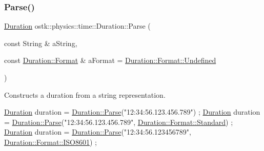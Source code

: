 \subsubsection{\texorpdfstring{Parse()}{Parse()}}
{\footnotesize\ttfamily \hyperlink{classostk_1_1physics_1_1time_1_1_duration}{Duration} ostk\+::physics\+::time\+::\+Duration\+::\+Parse (\begin{DoxyParamCaption}\item[{const String \&}]{a\+String,  }\item[{const \hyperlink{classostk_1_1physics_1_1time_1_1_duration_a4bf616b67d15e0fbc4beb4fcc306c368}{Duration\+::\+Format} \&}]{a\+Format = {\ttfamily \hyperlink{classostk_1_1physics_1_1time_1_1_duration_a4bf616b67d15e0fbc4beb4fcc306c368aec0fc0100c4fc1ce4eea230c3dc10360}{Duration\+::\+Format\+::\+Undefined}} }\end{DoxyParamCaption})\hspace{0.3cm}{\ttfamily [static]}}



Constructs a duration from a string representation. 


\begin{DoxyCode}
\hyperlink{classostk_1_1physics_1_1time_1_1_duration_a6ba3a020742ca6e3bf0b1970dd039c07}{Duration} duration = \hyperlink{classostk_1_1physics_1_1time_1_1_duration_afe4136976a7c4e5c2ec00c0aa5583b18}{Duration::Parse}(\textcolor{stringliteral}{"12:34:56.123.456.789"}) ;
\hyperlink{classostk_1_1physics_1_1time_1_1_duration_a6ba3a020742ca6e3bf0b1970dd039c07}{Duration} duration = \hyperlink{classostk_1_1physics_1_1time_1_1_duration_afe4136976a7c4e5c2ec00c0aa5583b18}{Duration::Parse}(\textcolor{stringliteral}{"12:34:56.123.456.789"}, 
      \hyperlink{classostk_1_1physics_1_1time_1_1_duration_a4bf616b67d15e0fbc4beb4fcc306c368aeb6d8ae6f20283755b339c0dc273988b}{Duration::Format::Standard}) ;
\hyperlink{classostk_1_1physics_1_1time_1_1_duration_a6ba3a020742ca6e3bf0b1970dd039c07}{Duration} duration = \hyperlink{classostk_1_1physics_1_1time_1_1_duration_afe4136976a7c4e5c2ec00c0aa5583b18}{Duration::Parse}(\textcolor{stringliteral}{"12:34:56.123456789"}, 
      \hyperlink{classostk_1_1physics_1_1time_1_1_duration_a4bf616b67d15e0fbc4beb4fcc306c368a35b6786739efcdc5a74ab1dca29d3b6b}{Duration::Format::ISO8601}) ;
\end{DoxyCode}



